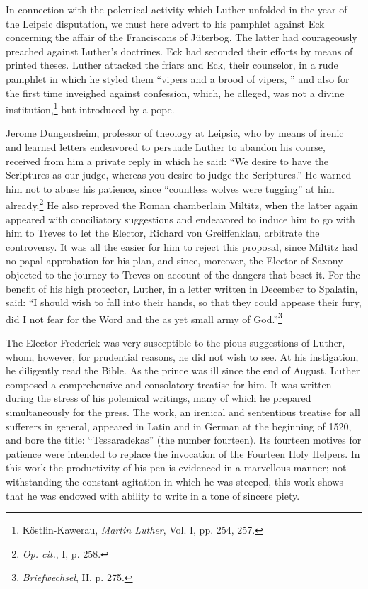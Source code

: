 In connection with the polemical activity which Luther unfolded
in the year of the Leipsic disputation, we must here advert to his
pamphlet against Eck concerning the affair of the Franciscans of
Jüterbog. The latter had courageously preached against Luther’s
doctrines. Eck had seconded their efforts by means of printed theses.
Luther attacked the friars and Eck, their counselor, in a rude pamphlet
in which he styled them “vipers and a brood of vipers, ” and also for
the first time inveighed against confession, which, he alleged, was
not a divine institution,\footnote{Köstlin-Kawerau, \textit{Martin Luther}, Vol. I, pp. 254, 257.}
but introduced by a pope.

Jerome Dungersheim, professor of theology at Leipsic, who by
means of irenic and learned letters endeavored to persuade Luther to
abandon his course, received from him a private reply in which he
said: “We desire to have the Scriptures as our judge, whereas you
desire to judge the Scriptures.” He warned him not to abuse his
patience, since “countless wolves were tugging” at him already.\footnote{\textit{Op. cit.}, I, p. 258.}
He also reproved the Roman chamberlain Miltitz, when the latter
again appeared with conciliatory suggestions and endeavored to induce
him to go with him to Treves to let the Elector, Richard von
Greiffenklau, arbitrate the controversy. It was all the easier for him
to reject this proposal, since Miltitz had no papal approbation for
his plan, and since, moreover, the Elector of Saxony objected to the
journey to Treves on account of the dangers that beset it. For the
benefit of his high protector, Luther, in a letter written in December
to Spalatin, said: “I should wish to fall into their hands, so that
they could appease their fury, did I not fear for the Word and the
as yet small army of God.”\footnote{\textit{Briefwechsel}, II, p. 275.}

The Elector Frederick was very susceptible to the pious suggestions
of Luther, whom, however, for prudential reasons, he did not wish
to see. At his instigation, he diligently read the Bible. As the prince was
ill since the end of August, Luther composed a comprehensive and
consolatory treatise for him. It was written during the stress of his
polemical writings, many of which he prepared simultaneously
for the press. The work, an irenical and sententious treatise for all
sufferers in general, appeared in Latin and in German at the beginning
of 1520, and bore the title: “Tessaradekas” (the number fourteen).
Its fourteen motives for patience were intended to replace
the invocation of the Fourteen Holy Helpers. In this work the
productivity of his pen is evidenced in a marvellous manner; not-
withstanding the constant agitation in which he was steeped, this
work shows that he was endowed with ability to write in a tone of
sincere piety.

